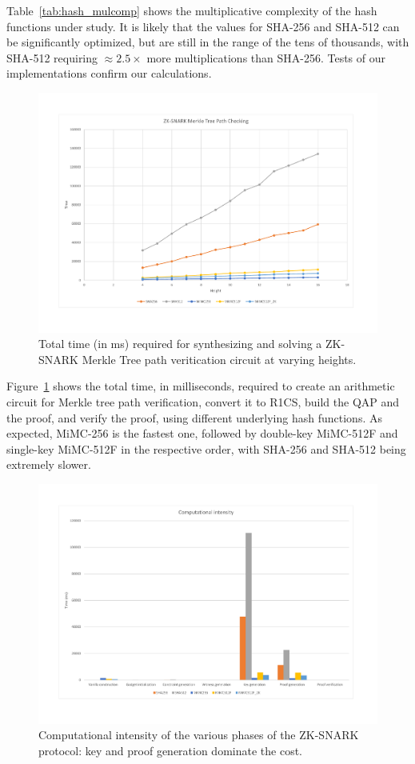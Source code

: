 Table~\ref{tab:hash_mulcomp} shows the multiplicative complexity of the hash functions under study.
It is likely that the values for SHA-256 and SHA-512 can be significantly optimized, but are still
in the range of the tens of thousands, with SHA-512 requiring \(\approx 2.5\times \) more
multiplications than SHA-256.
Tests of our implementations confirm our calculations.
\begin{figure}[t]
	\centering
	\includegraphics[scale=0.33]{res/mtree_total.pdf}
	\caption{Total time (in ms) required for synthesizing and solving a ZK-SNARK Merkle Tree path
		veritication circuit at varying heights.}\label{fig:mtree_total}
\end{figure}

Figure~\ref{fig:mtree_total} shows the total time, in milliseconds, required to create an
arithmetic circuit for Merkle tree path verification, convert it to R1CS, build the QAP and the
proof, and verify the proof, using different underlying hash functions.
As expected, MiMC-256 is the fastest one, followed by double-key MiMC-512F and single-key MiMC-512F
in the respective order, with SHA-256 and SHA-512 being extremely slower.
\begin{figure}
	\centering
	\includegraphics[scale=0.33]{res/mtree_intensity.pdf}
	\caption{Computational intensity of the various phases of the ZK-SNARK protocol: key and proof
		generation dominate the cost.}\label{fig:mtree_intensity}
\end{figure}

